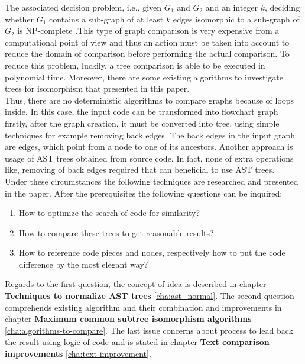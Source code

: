 \documentclass{report}
\begin{document}
The associated decision problem, i.e., given $ G_{1}$ and $ G_{2}$ and an integer $k$, deciding whether $ G_{1}$ contains a sub-graph of at least $k$ edges isomorphic to a sub-graph of $ G_{2}$ is NP-complete \cite{graph_isomorphism_is}.This type of graph comparison is very expensive from a computational point of view and thus an action must be taken into account to reduce the domain of comparison before performing the actual comparison. To reduce this problem, luckily, a tree comparison is able to be executed in polynomial time. Moreover, there are some existing algorithms to investigate trees for isomorphism that presented in this paper.\\
Thus, there are no deterministic algorithms to compare graphs because of loops inside. In this case, the input code can be transformed into flowchart graph firstly, after the graph creation, it must be converted into tree, using simple techniques for example removing back edges. The back edges in the input graph are edges, which point from a node to one of its ancestors. Another approach is usage of AST trees obtained from source code. In fact, none of extra operations like, removing of back edges required that can beneficial to use AST trees.
\\
Under these circumstances the following techniques are researched and presented in the paper.
After the prerequisites the following questions can be inquired:
\begin{enumerate}
 \item How to optimize the search of code for similarity?  
  \item How to compare these trees to get reasonable results?
  \item How to reference code pieces and nodes, respectively how to put the code difference by the most elegant way?
\end{enumerate}

Regards to the first question, the concept of idea is described in chapter \textbf{Techniques to normalize AST trees} \ref{cha:ast_normal}. The second question comprehends existing algorithm and their combination and improvements in chapter \textbf{Maximum common subtree isomorphism algorithms} \ref{cha:algorithms-to-compare}. The last issue concerns about process to lead back the result using logic of code and is stated in chapter \textbf{Text comparison improvements} \ref{cha:text-improvement}.

\end{document}
